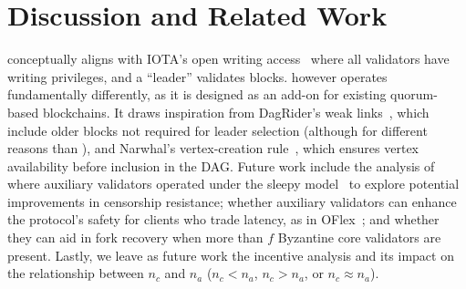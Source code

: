 \section{Discussion and Related Work} \label{sec:related}
\sysname conceptually aligns with IOTA's open writing access~\cite{cullen2021access,muller2022tangle,iota-wiki} where all validators have writing privileges, and a ``leader'' validates blocks.
%
\sysname however operates fundamentally differently, as it is designed as an add-on for existing quorum-based blockchains. It draws inspiration from DagRider's weak links~\cite{dag-rider}, which include older blocks not required for leader selection (although for different reasons than \sysname), and Narwhal's vertex-creation rule~\cite{narwhal}, which ensures vertex availability before inclusion in the DAG.
%
Future work include the analysis of \sysname where auxiliary validators operated under the sleepy model~\cite{pass2017sleepy} to explore potential improvements in censorship resistance; whether auxiliary validators can enhance the protocol's safety for clients who trade latency, as in OFlex~\cite{malkhi2019flexible, oflex}; and whether they can aid in fork recovery when more than $f$ Byzantine core validators are present. Lastly, we leave as future work the incentive analysis and its impact on the relationship between $n_c$ and $n_a$ ($n_c < n_a$, $n_c > n_a$, or $n_c \approx n_a$).